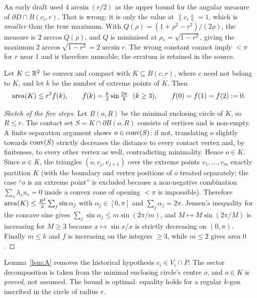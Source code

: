 \begin{remark}
An early draft used $4\arcsin(r/2)$ as the upper bound for the angular measure of
$\partial D\cap B(c_i,r)$. That is wrong: it is only the value at $\|c_i\|=1$, which is
\emph{smaller} than the true maximum. With $Q(\rho)=(1+\rho^2-r^2)/(2\rho)$, the measure is
$2\arccos Q(\rho)$, and $Q$ is minimised at $\rho_\ast=\sqrt{1-r^2}$, giving the maximum
$2\arccos\sqrt{1-r^2}=2\arcsin r$. The wrong constant cannot imply $<\pi$ for $r$ near $1$ and is
therefore unusable; the erratum is retained in the source.
\end{remark}

\begin{lemma}\label{lem:A}
Let $K\subset\mathbb{R}^2$ be convex and compact with $K\subseteq B(c,r)$, where $c$ need not belong to
$K$, and let $k$ be the number of extreme points of $K$. Then
\[
\operatorname{area}(K)\le r^2f(k),\qquad
f(k)=\tfrac k2\sin\tfrac{2\pi}k\ \ (k\ge3),\qquad f(0)=f(1)=f(2):=0 .
\]
\end{lemma}
\begin{proof}[Sketch of the five steps]
Let $B(o,R)$ be the minimal enclosing circle of $K$, so $R\le r$. The contact set
$S=K\cap\partial B(o,R)$ consists of vertices and is non-empty. A finite separation argument shows
$o\in\operatorname{conv}(S)$: if not, translating $o$ slightly towards $\operatorname{conv}(S)$ strictly decreases the distance
to every contact vertex and, by finiteness, to every other vertex as well, contradicting minimality.
Hence $o\in K$. Since $o\in K$, the triangles $(o,v_j,v_{j+1})$ over the extreme points
$v_1,\dots,v_m$ exactly partition $K$ (with the boundary and vertex positions of $o$ treated
separately; the case ``$o$ is an extreme point'' is excluded because a non-negative combination
$\sum_s\lambda_su_s=0$ inside a convex cone of opening $<\pi$ is impossible). Therefore
$\operatorname{area}(K)\le\frac{R^2}2\sum_j\sin\alpha_j$ with $\alpha_j\in[0,\pi]$ and $\sum_j\alpha_j=2\pi$.
Jensen's inequality for the concave sine gives $\sum_j\sin\alpha_j\le m\sin(2\pi/m)$, and
$M\mapsto M\sin(2\pi/M)$ is increasing for $M\ge3$ because $x\mapsto\sin x/x$ is strictly
decreasing on $(0,\pi)$. Finally $m\le k$ and $f$ is increasing on the integers $\ge3$, while
$m\le2$ gives area $0$.
\end{proof}

\begin{remark}
Lemma~\ref{lem:A} removes the historical hypothesis $c_i\in V_i\cap P$. The sector decomposition is
taken from the minimal enclosing circle's centre $o$, and $o\in K$ is \emph{proved}, not assumed.
The bound is optimal: equality holds for a regular $k$-gon inscribed in the circle of radius $r$.
\end{remark}

